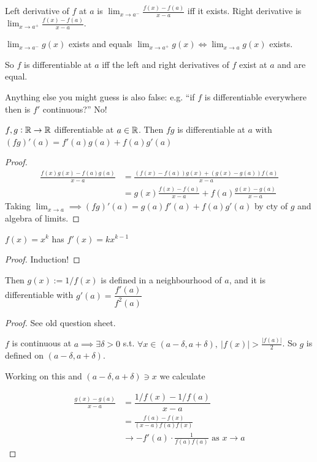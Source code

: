 \begin{definition}
Left derivative of $f$ at $a$ is $\lim_{x \to a^-}\frac{f(x) -f(a)}{x-a}$ iff it exists. Right derivative is $\lim_{x \to a^+}\frac{f(x) -f(a)}{x-a}$. 

$\lim_{x \to a^-}g(x)$ exists and equals $\lim_{x \to a^+}g(x) \iff \lim_{x\to a}g(x)$ exists.
\end{definition}

So $f$ is differentiable at $a$ iff the left and right derivatives of $f$ exist at $a$ and are equal. 

Anything else you might guess is also false: e.g. ``if $f$ is differentiable everywhere then is $f'$ continuous?'' No!\vspace*{10pt}

\begin{theorem} $f,g : \mathbb{R} \to \mathbb{R}$ differentiable at $a \in \mathbb{R}$. Then $fg$ is differentiable at $a$ with $(fg)'(a) = f'(a)g(a) + f(a)g'(a)$
\end{theorem}
\begin{proof}
\[\begin{aligned}
	\frac{f(x)g(x) - f(a)g(a)}{x-a} &= \frac{(f(x)-f(a))g(x) + (g(x) - g(a))f(a)}{x-a} \\ 
	&= g(x) \frac{f(x)-f(a)}{x-a} + f(a)\frac{g(x)-g(a)}{x-a}
\end{aligned}
\]
Taking $\lim_{x\to a} \implies (fg)'(a) = g(a)f'(a) + f(a)g'(a)$ by cty of $g$ and algebra of limits.
\end{proof}
\pagebreak

\begin{corollary}
$f(x) = x^k$ has $f'(x) = kx^{k-1}$	
\end{corollary}
\begin{proof}
Induction!	
\end{proof}

Then $g(x) := 1/f(x)$ is defined in a neighbourhood of $a$, and it is differentiable with $g'(a) = \dfrac{f'(a)}{f^2(a)}$

\begin{proof}
See old question sheet.

 $f$ is continuous at $a \implies \exists \delta > 0$ s.t. $\forall x \in (a-\delta,a+\delta),~|f(x)| > \frac{|f(a)|}{2}$. So $g$ is defined on $(a-\delta,a+\delta)$. 
 
 Working on this and $(a-\delta,a+\delta)\ni x$ we calculate
 
 \[\begin{aligned}\frac{g(x) -g(a)}{x-a} &= \dfrac{1/f(x) -1/f(a)}{x-a}\\
 &= \frac{f(a) - f(x)}{(x-a)f(a)f(x)}\\
 &\to -f'(a)\cdot\frac{1}{f(a)f(a)} \text{ as } x \to a
\end{aligned}\]
\end{proof}


